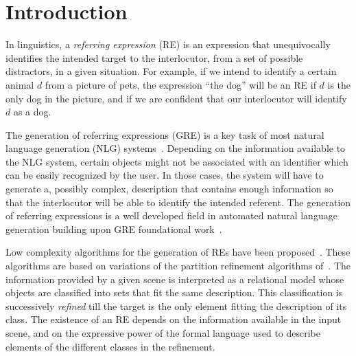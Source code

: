 \section{Introduction}\label{sec:gre}

In linguistics, a \emph{referring expression} (RE) is an expression that 
unequivocally identifies the intended target to the interlocutor, from a set of possible distractors, in a given situation.  
For example, if we intend to identify a certain animal $d$ from a picture of pets, the expression 
``the dog'' will be an RE if $d$ is the only dog in the picture, and if we are confident
that our interlocutor will identify $d$ as a dog. 

The generation of referring expressions (GRE)  is a key task of most natural 
language generation (NLG) systems~\cite[Section 5.4]{dale2000}. 
Depending on the information available to the NLG system, certain objects might 
not be associated with an identifier which can be easily recognized by the user. 
In those cases, the system will have to generate a, possibly complex, description that contains 
enough information so that the interlocutor will be able to identify the intended referent.
The generation of referring expressions is a well developed field in automated natural language generation building upon GRE foundational work~\cite{winograd,dale89cooking,Dale1995}. 

Low complexity algorithms for the generation 
of REs have been proposed~\cite{arec2:2008:Areces,arec:usin11}. These algorithms are based on variations of the partition refinement algorithms of~\cite{paig:thre87}.
The information provided by a given scene is interpreted as a relational model whose 
objects are classified into sets that fit the same description.  
This classification is successively \emph{refined}  till the target 
is the only element fitting the description of its class.  The existence of an RE 
depends on the information available in the input scene, and on the expressive power of the formal 
language used to describe elements of the different classes in the refinement. 


